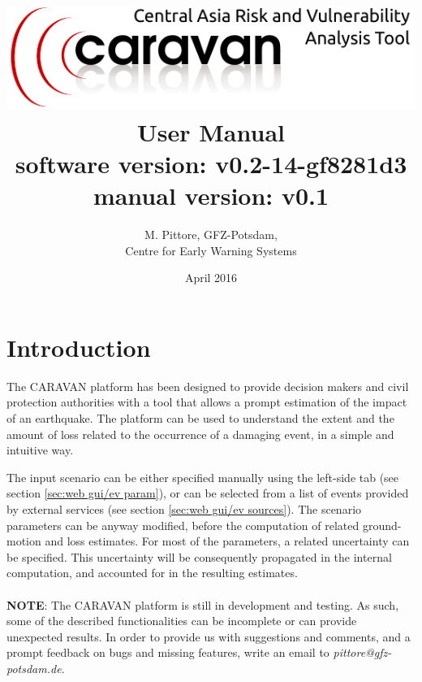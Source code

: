 \documentclass[12p]{article}
\begin{document}
\title{
\includegraphics[width=\textwidth]{banner}
User Manual \\ \Large software version: v0.2-14-gf8281d3 \\ manual version:
v0.1}

\author{M. Pittore, GFZ-Potsdam,\\ Centre for Early Warning Systems}
\date{April 2016}
\maketitle

\tableofcontents

\newpage
\section{Introduction}
\label{sec:intro}

The CARAVAN platform has been designed to provide decision makers and civil
protection authorities with a tool that allows a prompt estimation of the impact
of an earthquake. The platform can be used to understand the extent and the
amount of loss related to the occurrence of a damaging event, in a simple and
intuitive way. 

The input scenario can be either specified manually using the left-side tab (see
section \ref{sec:web gui/ev param}), or can be selected from a list of events
provided by external services (see section \ref{sec:web gui/ev sources}). The
scenario parameters can be anyway modified, before the computation of related
ground-motion and loss estimates. For most of the parameters, a related
uncertainty can be specified. This uncertainty will be consequently propagated
in the internal computation, and accounted for in the resulting estimates.
\\
\\
\textbf{NOTE}: The CARAVAN platform is still in development and testing. As
such, some of the described functionalities can be incomplete or can provide
unexpected results. In order to provide us with suggestions and comments, and a
prompt feedback on bugs and missing features, write an email to
\emph{pittore@gfz-potsdam.de}.
\end{document}
